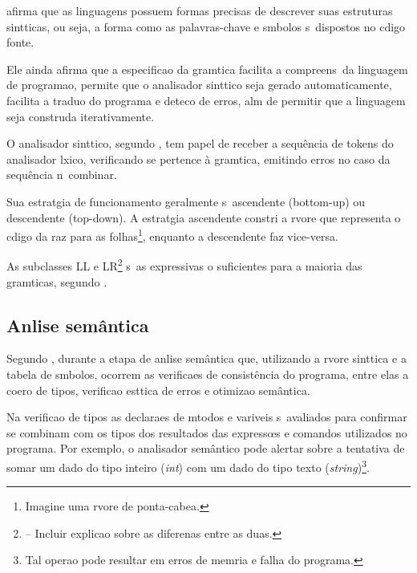 \cite{Aho08} afirma que as linguagens possuem formas precisas de descrever suas estruturas sint\ah ticas, ou seja, a forma como as palavras-chave e s\ih mbolos s\ao\ dispostos no c\oh digo fonte.

Ele ainda afirma que a especifica\ca o da gram\ah tica facilita a compreens\ao\ da linguagem de programa\ca o, permite que o analisador sint\ah tico seja gerado automaticamente, facilita a tradu\ca o do programa e detec\ca o de erros, al\eh m de permitir que a linguagem seja constru\ih da iterativamente.

O analisador sint\ah tico, segundo \cite{Aho08}, tem papel de receber a sequ\^encia de tokens do analisador l\eh xico, verificando se pertence \`a gram\ah tica, emitindo erros no caso da sequ\^encia n\ao\ combinar.

Sua estrat\eh gia de funcionamento geralmente s\ao\ ascendente (bottom-up) ou descendente (top-down). A estrat\eh gia ascendente constr\oh i a \ah rvore que representa o c\oh digo da ra\ih z para as folhas\footnote{Imagine uma \ah rvore de ponta-cabe\cc a.}, enquanto a descendente faz vice-versa.

As subclasses LL e LR\footnote{-- Incluir explica\ca o sobre as diferen\cc as entre as duas.} s\ao\ as expressivas o suficientes para a maioria das gram\ah ticas, segundo \cite{Aho08}.








\subsection{An\ah lise sem\^antica}

Segundo \cite{Aho08}, \eh durante a etapa de an\ah lise sem\^antica que, utilizando a \ah rvore sint\ah tica e a tabela de s\ih mbolos, ocorrem as verifica\co es de consist\^encia do programa, entre elas a coer\ca o de tipos, verifica\ca o est\ah tica de erros e otimiza\ca o sem\^antica.

Na verifica\ca o de tipos as declara\co es de m\eh todos e vari\ah veis s\ao\ avaliados para confirmar se combinam com os tipos dos resultados das express\oe s e comandos utilizados no programa. Por exemplo, o analisador sem\^antico pode alertar sobre a tentativa de somar um dado do tipo inteiro (\emph{int}) com um dado do tipo texto (\emph{string})\footnote{Tal opera\ca o pode resultar em erros de mem\oh ria e falha do programa.}.

